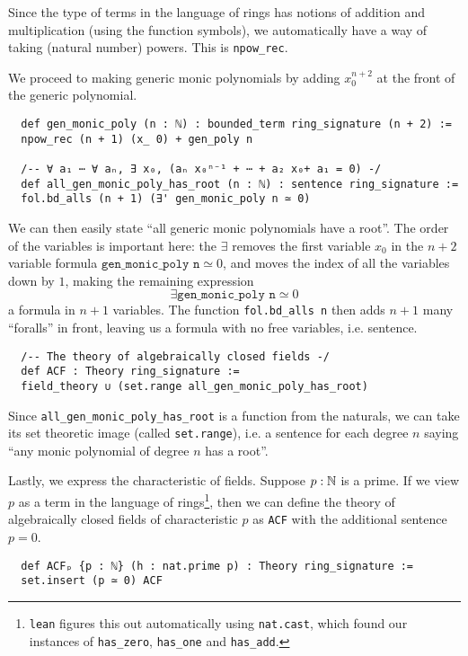 \begin{dfn}
  Since the type of terms in the language of rings has notions of
  addition and multiplication (using the function symbols),
  we automatically have a way of taking (natural number) powers.
  This is \texttt{npow\_rec}.

  We proceed to making generic monic polynomials by adding
  $x_{0}^{n+2}$ at the front of the generic polynomial.

  \begin{lstlisting}
  def gen_monic_poly (n : ℕ) : bounded_term ring_signature (n + 2) :=
  npow_rec (n + 1) (x_ 0) + gen_poly n

  /-- ∀ a₁ ⋯ ∀ aₙ, ∃ x₀, (aₙ x₀ⁿ⁻¹ + ⋯ + a₂ x₀+ a₁ = 0) -/
  def all_gen_monic_poly_has_root (n : ℕ) : sentence ring_signature :=
  fol.bd_alls (n + 1) (∃' gen_monic_poly n ≃ 0) \end{lstlisting}

  We can then easily state ``all generic monic polynomials have a root''.
  The order of the variables is important here:
  the $\exists$ removes the first variable $x_{0}$ in the $n+2$ variable formula
  $\texttt{gen\_monic\_poly n} \simeq 0$, and moves the index of all the
  variables down by $1$, making the remaining expression
  \[\exists \texttt{gen\_monic\_poly n} \simeq 0\] a formula in $n+1$ variables.
  The function \texttt{fol.bd\_alls n} then adds $n+1$ many ``foralls''
  in front, leaving us a formula with no free variables, i.e. sentence.

  \begin{lstlisting}
  /-- The theory of algebraically closed fields -/
  def ACF : Theory ring_signature :=
  field_theory ∪ (set.range all_gen_monic_poly_has_root)\end{lstlisting}

  Since \texttt{all\_gen\_monic\_poly\_has\_root} is a function from the naturals,
  we can take its set theoretic image (called \texttt{set.range}),
  i.e. a sentence for each degree $n$ saying
  ``any monic polynomial of degree $n$ has a root''.

  Lastly, we express the characteristic of fields.
  Suppose $p : \mathbb{N}$ is a prime.
  If we view $p$ as a term in the language of rings\footnote{
    \texttt{lean} figures this out automatically using \texttt{nat.cast},
    which found our instances of \texttt{has\_zero}, \texttt{has\_one}
    and \texttt{has\_add}.
  },
  then we can define the theory of algebraically closed fields of characteristic $p$
  as \texttt{ACF} with the additional sentence $p = 0$.

  \begin{lstlisting}
  def ACFₚ {p : ℕ} (h : nat.prime p) : Theory ring_signature :=
  set.insert (p ≃ 0) ACF\end{lstlisting}


\end{dfn}
